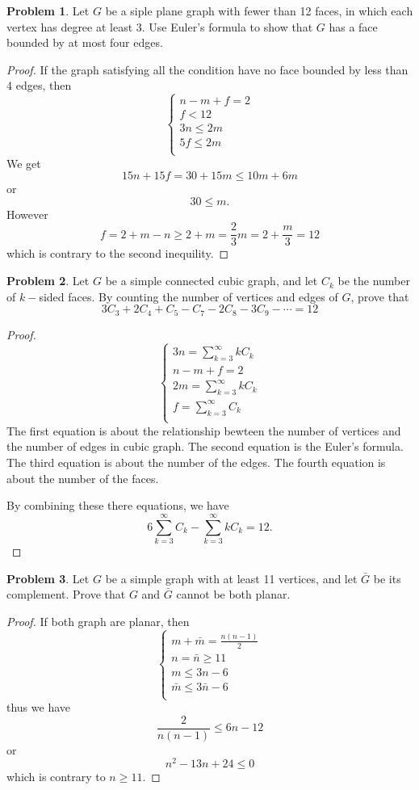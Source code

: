 \documentclass[a4paper,11pt]{article}%
\theoremstyle{remark}
\theoremstyle{definition}
\newtheorem{problem}{Problem}[subsection]
\begin{document}
\begin{problem}
    Let $G$ be a siple plane graph with fewer than 12 faces, in which each vertex has degree at least 3.
    Use Euler's formula to show that $G$ has a face bounded by at most four edges.
\begin{proof}
    If the graph satisfying all the condition have no face bounded by less than 4 edges, then
    \[
    \begin{cases}
        n-m+f=2\\
        f<12\\
        3n\leq 2m\\
        5f\leq 2m\\
    \end{cases}
    \]
    We get 
    \[15n+15f=30+15m\leq 10m+6m\]
    or 
    \[30\leq m.\]
    However
    \[f=2+m-n\geq 2+m=\frac{2}{3}m=2+\frac{m}{3}=12\]
    which is contrary to the second inequility.
\end{proof}
\end{problem}
\begin{problem}
    Let $G$ be a simple connected cubic graph, and let $C_k$ be the number of $k-$sided faces.
    By counting the number of vertices and edges of $G$, prove that
    \[3C_3+2C_4+C_5-C_7-2C_8-3C_9-\cdots=12 \]
    \begin{proof}
        \[
    \begin{cases}
        3n=\sum_{k=3}^{\infty}kC_k\\
        n-m+f=2\\
        2m=\sum_{k=3}^{\infty}kC_k\\
        f=\sum_{k=3}^{\infty}C_k\\
    \end{cases}
    \]
    The first equation is about the relationship bewteen the number of vertices and the number of edges in cubic graph.
    The second equation is the Euler's formula.
    The third equation is about the number of the edges.
    The fourth equation is about the number of the faces.

    By combining these there equations, we have 
\[6\sum_{k=3}^{\infty}C_k-\sum_{k=3}^{\infty}kC_k=12.\]
    \end{proof}
\end{problem}
\begin{problem}
    Let $G$ be a simple graph with at least 11 vertices, and let $\bar{G}$ be its complement.
    Prove that $G$ and $\bar{G}$ cannot be both planar.
    \begin{proof}
        If both graph are planar, then
        \[
        \begin{cases}
            m+\bar{m}=\frac{n(n-1)}{2}\\
            n=\bar{n}\geq 11\\
            m\leq 3n-6\\
            \bar{m}\leq 3\bar{n}-6\\
        \end{cases}
        \]
        thus we have 
        \[\frac{2}{n(n-1)}\leq 6n-12\]
        or 
        \[n^2-13n+24\leq 0\]
        which is contrary to $n\geq 11$.
    \end{proof}
\end{problem}
\end{document}
